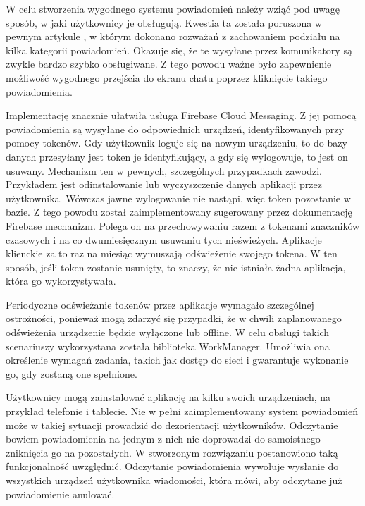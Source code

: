 W celu stworzenia wygodnego systemu powiadomień należy wziąć pod uwagę sposób, w jaki użytkownicy je obsługują. Kwestia ta została poruszona w pewnym artykule \cite{notifications-dismissed}, w którym dokonano rozważań z zachowaniem podziału na kilka kategorii powiadomień. Okazuje się, że te wysyłane przez komunikatory są zwykle bardzo szybko obsługiwane. Z tego powodu ważne było zapewnienie możliwość wygodnego przejścia do ekranu chatu poprzez kliknięcie takiego powiadomienia.

Implementację znacznie ułatwiła usługa Firebase Cloud Messaging. Z jej pomocą powiadomienia są wysyłane do odpowiednich urządzeń, identyfikowanych przy pomocy tokenów. Gdy użytkownik loguje się na nowym urządzeniu, to do bazy danych przesyłany jest token je identyfikujący, a gdy się wylogowuje, to jest on usuwany. Mechanizm ten w pewnych, szczególnych przypadkach zawodzi. Przykładem jest odinstalowanie lub wyczyszczenie danych aplikacji przez użytkownika. Wówczas jawne wylogowanie nie nastąpi, więc token pozostanie w bazie. Z tego powodu został zaimplementowany sugerowany przez dokumentację Firebase \cite{firebase-docs} mechanizm. Polega on na przechowywaniu razem z tokenami znaczników czasowych i na co dwumiesięcznym usuwaniu tych nieświeżych. Aplikacje klienckie za to raz na miesiąc wymuszają odświeżenie swojego tokena. W ten sposób, jeśli token zostanie usunięty, to znaczy, że nie istniała żadna aplikacja, która go wykorzystywała. 

Periodyczne odświeżanie tokenów przez aplikacje wymagało szczególnej ostrożności, ponieważ mogą zdarzyć się przypadki, że w chwili zaplanowanego odświeżenia urządzenie będzie wyłączone lub offline. W celu obsługi takich scenariuszy wykorzystana została biblioteka WorkManager. Umożliwia ona określenie wymagań zadania, takich jak dostęp do sieci i gwarantuje wykonanie go, gdy zostaną one spełnione.

Użytkownicy mogą zainstalować aplikację na kilku swoich urządzeniach, na przykład telefonie i tablecie. Nie w pełni zaimplementowany system powiadomień może w takiej sytuacji prowadzić do dezorientacji użytkowników. Odczytanie bowiem powiadomienia na jednym z nich nie doprowadzi do samoistnego zniknięcia go na pozostałych. W stworzonym rozwiązaniu postanowiono taką funkcjonalność uwzględnić. Odczytanie powiadomienia wywołuje wysłanie do wszystkich urządzeń użytkownika wiadomości, która mówi, aby odczytane już powiadomienie anulować.